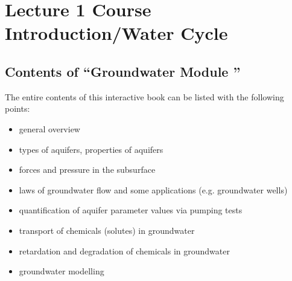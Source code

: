 \documentclass[letterpaper,10pt,english]{sphinxmanual}
\begin{document}
\section{Lecture 1 \sphinxhyphen{} Course Introduction/Water Cycle}
\label{\detokenize{contents/background/03_basic_hydrogeology:lecture-1-course-introduction-water-cycle}}\label{\detokenize{contents/background/03_basic_hydrogeology::doc}}


\subsection{Contents of “Groundwater Module ”}
\label{\detokenize{contents/background/03_basic_hydrogeology:contents-of-groundwater-module}}
The entire contents of this interactive book can be listed with the following points:
\begin{itemize}
\item {} 
general overview

\item {} 
types of aquifers, properties of aquifers

\item {} 
forces and pressure in the subsurface

\item {} 
laws of groundwater flow and some applications (e.g. groundwater wells)

\item {} 
quantification of aquifer parameter values via pumping tests

\item {} 
transport of chemicals (solutes) in groundwater

\item {} 
retardation and degradation of chemicals in groundwater

\item {} 
groundwater modelling

\end{itemize}
\end{document}

